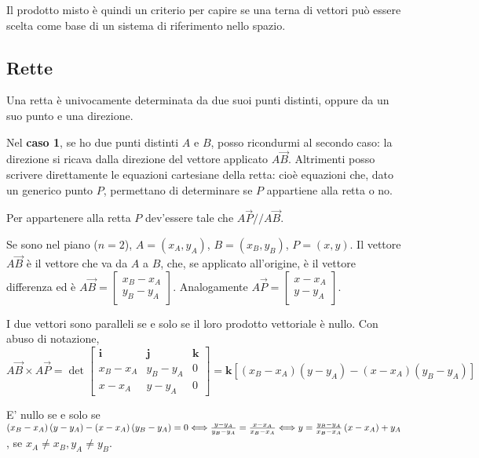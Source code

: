 \documentclass{article}
\begin{document}
Il prodotto misto \`{e} quindi un criterio per capire se una terna di
vettori pu\`{o} essere scelta come base di un sistema di riferimento nello
spazio.

\subsection{Rette}

Una retta \`{e} univocamente determinata da due suoi punti distinti, oppure
da un suo punto e una direzione.

Nel \textbf{caso 1}, se ho due punti distinti $A$ e $B$, posso ricondurmi al
secondo caso: la direzione si ricava dalla direzione del vettore applicato $A%
\vec{B}$. Altrimenti posso scrivere direttamente le equazioni cartesiane
della retta: cio\`{e} equazioni che, dato un generico punto $P$, permettano
di determinare se $P$ appartiene alla retta o no.

Per appartenere alla retta $P$ dev'essere tale che $A\vec{P}//A\vec{B}$.

Se sono nel piano ($n=2$), $A=\left( x_{A},y_{A}\right) $, $B=\left(
x_{B},y_{B}\right) $, $P=\left( x,y\right) $. Il vettore $A\vec{B}$ \`{e} il
vettore che va da $A$ a $B$, che, se applicato all'origine, \`{e} il vettore
differenza ed \`{e} $A\vec{B}=\left[ 
\begin{array}{c}
x_{B}-x_{A} \\ 
y_{B}-y_{A}%
\end{array}%
\right] $. Analogamente $A\vec{P}=\left[ 
\begin{array}{c}
x-x_{A} \\ 
y-y_{A}%
\end{array}%
\right] $.

I due vettori sono paralleli se e solo se il loro prodotto vettoriale \`{e}
nullo. Con abuso di notazione,%
\begin{equation*}
A\vec{B}\times A\vec{P}=\det \left[ 
\begin{array}{ccc}
\mathbf{i} & \mathbf{j} & \mathbf{k} \\ 
x_{B}-x_{A} & y_{B}-y_{A} & 0 \\ 
x-x_{A} & y-y_{A} & 0%
\end{array}%
\right] =\mathbf{k}\left[ \left( x_{B}-x_{A}\right) \left( y-y_{A}\right)
-\left( x-x_{A}\right) \left( y_{B}-y_{A}\right) \right]
\end{equation*}

E' nullo se e solo se $\left( x_{B}-x_{A}\right) \left( y-y_{A}\right)
-\left( x-x_{A}\right) \left( y_{B}-y_{A}\right) =0\Longleftrightarrow \frac{%
y-y_{A}}{y_{B}-y_{A}}=\frac{x-x_{A}}{x_{B}-x_{A}}\Longleftrightarrow y=\frac{%
y_{B}-y_{A}}{x_{B}-x_{A}}\left( x-x_{A}\right) +y_{A}$, se $x_{A}\neq
x_{B},y_{A}\neq y_{B}$.
\end{document}
